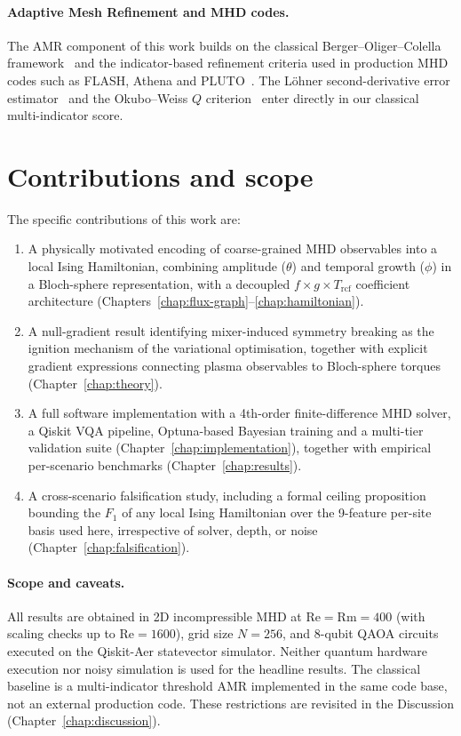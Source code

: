 \documentclass[12pt, a4paper, oneside]{report}
\begin{document}
\paragraph{Adaptive Mesh Refinement and MHD codes.}
The AMR component of this work builds on the classical Berger--Oliger--Colella framework~\cite{berger1984,berger1989} and the indicator-based refinement criteria used in production MHD codes such as FLASH, Athena and PLUTO~\cite{fryxell2000,stone2008,mignone2007}. The L\"ohner second-derivative error estimator~\cite{lohner1987} and the Okubo--Weiss $Q$ criterion~\cite{okubo1970,weiss1991} enter directly in our classical multi-indicator score.

\section*{Contributions and scope}

The specific contributions of this work are:
\begin{enumerate}
    \item A physically motivated encoding of coarse-grained MHD observables into a local Ising Hamiltonian, combining amplitude ($\theta$) and temporal growth ($\phi$) in a Bloch-sphere representation, with a decoupled $f \times g \times T_{\mathrm{rcf}}$ coefficient architecture (Chapters~\ref{chap:flux-graph}--\ref{chap:hamiltonian}).
    \item A null-gradient result identifying mixer-induced symmetry breaking as the ignition mechanism of the variational optimisation, together with explicit gradient expressions connecting plasma observables to Bloch-sphere torques (Chapter~\ref{chap:theory}).
    \item A full software implementation with a 4th-order finite-difference MHD solver, a Qiskit VQA pipeline, Optuna-based Bayesian training and a multi-tier validation suite (Chapter~\ref{chap:implementation}), together with empirical per-scenario benchmarks (Chapter~\ref{chap:results}).
    \item A cross-scenario falsification study, including a formal ceiling proposition bounding the $F_1$ of any local Ising Hamiltonian over the 9-feature per-site basis used here, irrespective of solver, depth, or noise (Chapter~\ref{chap:falsification}).
\end{enumerate}

\paragraph{Scope and caveats.}
All results are obtained in 2D incompressible MHD at $\mathrm{Re} = \mathrm{Rm} = 400$ (with scaling checks up to $\mathrm{Re} = 1600$), grid size $N = 256$, and 8-qubit QAOA circuits executed on the Qiskit-Aer statevector simulator. Neither quantum hardware execution nor noisy simulation is used for the headline results. The classical baseline is a multi-indicator threshold AMR implemented in the same code base, not an external production code. These restrictions are revisited in the Discussion (Chapter~\ref{chap:discussion}).
\end{document}

